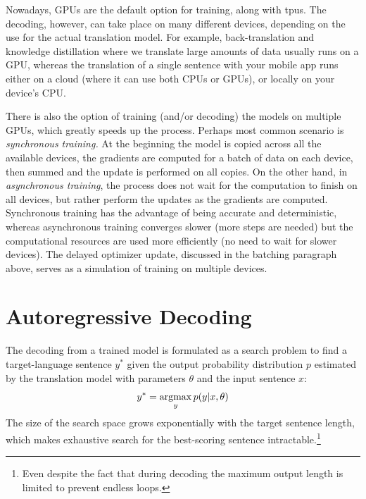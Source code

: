 Nowadays, GPUs are the default option for training, along with \acp{tpu}. The
decoding, however, can take place on many different devices, depending on the
use for the actual translation model. For example, back-translation and
knowledge distillation where we translate large amounts of data usually runs on
a GPU, whereas the translation of a single sentence with your mobile app runs
either on a cloud (where it can use both CPUs or GPUs), or locally on your
device's CPU.

There is also the option of training (and/or decoding) the models on multiple
GPUs, which greatly speeds up the process. Perhaps most common scenario is
\emph{synchronous training.} At the beginning the model is copied across all
the available devices, the gradients are computed for a batch of data on each
device, then summed and the update is performed on all copies. On the other
hand, in \emph{asynchronous training}, the process does not wait for the
computation to finish on all devices, but rather perform the updates as the
gradients are computed. Synchronous training has the advantage of being
accurate and deterministic, whereas asynchronous training converges slower
(more steps are needed) but the computational resources are used more
efficiently (no need to wait for slower devices).  The delayed optimizer
update, discussed in the batching paragraph above, serves as a simulation of
training on multiple devices.

\section{Autoregressive Decoding}
\label{sec:decoding}

The decoding from a trained model is formulated as a search problem to find a
target-language sentence $y^*$ given the output probability distribution $p$
estimated by the translation model with parameters $\theta$ and the input
sentence $x$:
%
\begin{equation}
  y^* = \operatorname*{argmax}_{y} p(y|x, \theta)
  \label{eq:argmax-search}
\end{equation}
%
The size of the search space grows exponentially with the target sentence
length, which makes exhaustive search for the best-scoring sentence
intractable.\footnote{Even despite the fact that during decoding the maximum
  output length is limited to prevent endless loops.}

